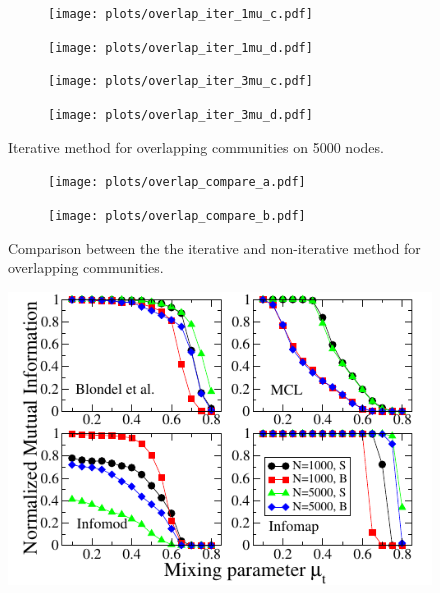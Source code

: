 \begin{figure}
    \centering
    \begin{subfigure}{0.5\textwidth}
    \texttt{[image: plots/overlap\_iter\_1mu\_c.pdf]}
    \end{subfigure}%
    \begin{subfigure}{0.5\textwidth}
    \texttt{[image: plots/overlap\_iter\_1mu\_d.pdf]}
    \end{subfigure}
    \begin{subfigure}{0.5\textwidth}
    \texttt{[image: plots/overlap\_iter\_3mu\_c.pdf]}
    \end{subfigure}%
    \begin{subfigure}{0.5\textwidth}
    \texttt{[image: plots/overlap\_iter\_3mu\_d.pdf]}
    \end{subfigure}
    \caption{Iterative method for overlapping communities on 5000 nodes.}\label{fig:iter_overlap_5000N}
\end{figure}

\begin{figure}
    \centering
    \begin{subfigure}{0.5\textwidth}
    \texttt{[image: plots/overlap\_compare\_a.pdf]}
    \end{subfigure}%
    \begin{subfigure}{0.5\textwidth}
    \texttt{[image: plots/overlap\_compare\_b.pdf]}
    \end{subfigure}
    \caption{Comparison between the the iterative and non-iterative method for overlapping communities.}\label{fig:compare_iter_overlap}
\end{figure}


\begin{figure}
    \centering
    \includegraphics{lfrpaper/fig2_a.pdf}
\end{figure}

